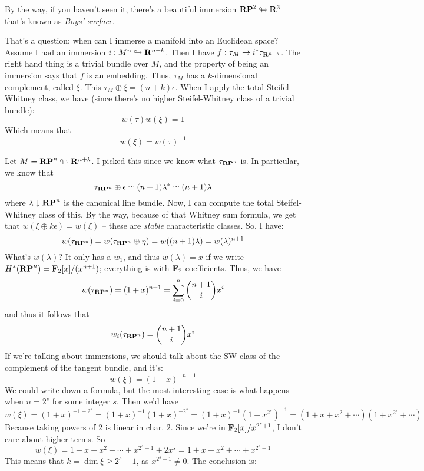 By the way, if you haven't seen it, there's a beautiful immersion $\mathbf{RP}^2 \looparrowright \mathbf R^3$ that's known as \emph{Boys' surface}.

That's a question; when can I immerse a manifold into an Euclidean space?
Assume I had an immersion $i:M^n\looparrowright \mathbf R^{n+k}$.
Then I have $f:\tau_M \to i^\ast \tau_{\mathbf R^{n+k}}$.
The right hand thing is a trivial bundle over $M$, and the property of being an immersion says that $f$ is an embedding.
Thus, $\tau_M$ has a $k$-dimensional complement, called $\xi$.
This $\tau_M\oplus\xi = (n+k)\epsilon$.
When I apply the total Steifel-Whitney class, we have (since there's no higher Steifel-Whitney class of a trivial bundle):
$$
w(\tau)w(\xi) = 1
$$
Which means that
$$
w(\xi) = w(\tau)^{-1}
$$
\begin{example}
    Let $M = \mathbf{RP}^n\looparrowright \mathbf R^{n+k}$.
    I picked this since we know what $\tau_{\mathbf{RP}^n}$ is.
    In particular, we know that
    $$
    \tau_{\mathbf{RP}^n}\oplus\epsilon\simeq (n+1)\lambda^\ast \simeq (n+1)\lambda
    $$
    where $\lambda\downarrow \mathbf{RP}^n$ is the canonical line bundle.
    Now, I can compute the total Steifel-Whitney class of this.
    By the way, because of that Whitney sum formula, we get that $w(\xi\oplus k\epsilon) = w(\xi)$ -- these are \emph{stable} characteristic classes.
    So, I have:
    $$
    w(\tau_{\mathbf{RP}^n}) = w(\tau_{\mathbf{RP}^n}\oplus\eta) = w((n+1)\lambda) = w(\lambda)^{n+1}
    $$
    What's $w(\lambda)$?
    It only has a $w_1$, and thus $w(\lambda) = x$ if we write $H^\ast(\mathbf{RP}^n) = \mathbf F_2[x]/(x^{n+1})$; everything is with $\mathbf F_2$-coefficients.
    Thus, we have
    $$
    w(\tau_{\mathbf{RP}^n}) = (1+x)^{n+1} = \sum^n_{i=0}\binom{n+1}{i}x^i
    $$
    and thus it follows that
    $$
    w_i(\tau_{\mathbf{RP}^n}) = \binom{n+1}{i}x^i
    $$
    If we're talking about immersions, we should talk about the SW class of the complement of the tangent bundle, and it's:
    $$
    w(\xi) = (1+x)^{-n-1}
    $$
    We could write down a formula, but the most interesting case is what happens when $n=2^s$ for some integer $s$.
    Then we'd have
    $$
    w(\xi) = (1+x)^{-1-2^s} = (1+x)^{-1}(1+x)^{-2^s} = (1+x)^{-1}(1+x^{2^s})^{-1} = (1+x+x^2+\cdots)(1+x^{2^s}+\cdots)
    $$
    Because taking powers of $2$ is linear in char. $2$.
    Since we're in $\mathbf F_2[x]/x^{2^s+1}$, I don't care about higher terms.
    So
    $$
    w(\xi) = 1+x+x^2+\cdots+x^{2^s-1}+2x^s = 1+x+x^2+\cdots+x^{2^s-1}
    $$
    This means that $k = \dim\xi \geq 2^s-1$, as $x^{2^s-1}\neq 0$.
    The conclusion is:
    \begin{theorem}

\end{theorem}
\end{example}

